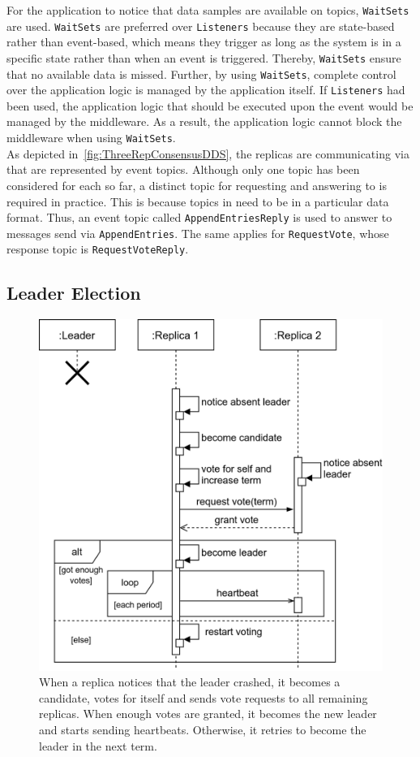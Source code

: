 \noindent
For the application to notice that data samples are available on topics,  \texttt{WaitSets} are used.
\texttt{WaitSets} are preferred over  \texttt{Listeners} because they are state-based rather than event-based, which means they trigger as long as the system is in a specific state rather than when an event is triggered.
Thereby, \texttt{WaitSets} ensure that no available data is missed.
Further, by using \texttt{WaitSets}, complete control over the application logic is managed by the application itself.
If \texttt{Listeners} had been used, the application logic that should be executed upon the event would be managed by the middleware.
As a result, the application logic cannot block the middleware when using \texttt{WaitSets}.
\\

\noindent
As depicted in~\autoref{fig:ThreeRepConsensusDDS}, the replicas are communicating via  that are represented by  event topics.
Although only one topic has been considered for each  so far, a distinct  topic for requesting and answering to  is required in practice.
This is because topics in  need to be in a particular data format.
Thus, an event topic called \texttt{AppendEntriesReply} is used to answer to messages send via \texttt{AppendEntries}.
The same applies for \texttt{RequestVote}, whose response topic is \texttt{RequestVoteReply}.


\subsection{Leader Election}
\begin{figure}[!ht]
	\centering
	\includegraphics[width=0.75\linewidth]{images/sequence/LeaderElection}
	\caption{When a replica notices that the leader crashed, it becomes a candidate, votes for itself and sends vote requests to all remaining replicas. When enough votes are granted, it becomes the new leader and starts sending heartbeats. Otherwise, it retries to become the leader in the next term.}
	\label{fig:SeqLeaderElection}
\end{figure}

